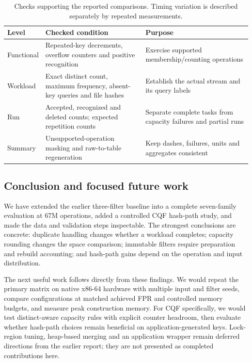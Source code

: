 \begin{table}[!htbp]\centering\small
\caption{Checks supporting the reported comparisons. Timing variation is described separately by repeated measurements.}
\label{tab:validation-levels}
\begin{tabular}{L{2.0cm}L{5.3cm}L{5.3cm}}\toprule
\textbf{Level}&\textbf{Checked condition}&\textbf{Purpose}\\\midrule
Functional&Repeated-key decrements, overflow counters and positive recognition&Exercise supported membership/counting operations\\
Workload&Exact distinct count, maximum frequency, absent-key queries and file hashes&Establish the actual stream and its query labels\\
Run&Accepted, recognized and deleted counts; expected repetition counts&Separate complete tasks from capacity failures and partial runs\\
Summary&Unsupported-operation masking and raw-to-table regeneration&Keep dashes, failures, units and aggregates consistent\\\bottomrule
\end{tabular}
\end{table}

\subsection{Conclusion and focused future work}
We have extended the earlier three-filter baseline into a complete seven-family evaluation at 67M operations, added a controlled CQF hash-path study, and made the data and validation steps inspectable. The strongest conclusions are concrete: duplicate handling changes whether a workload completes; capacity rounding changes the space comparison; immutable filters require preparation and rebuild accounting; and hash-path gains depend on the operation and input distribution.

The next useful work follows directly from these findings. We would repeat the primary matrix on native x86-64 hardware with multiple input and filter seeds, compare configurations at matched achieved FPR and controlled memory budgets, and measure peak construction memory. For CQF specifically, we would test distinct-aware capacity rules with explicit counter headroom, then evaluate whether hash-path choices remain beneficial on application-generated keys. Lock-region tuning, heap-based merging and an application wrapper remain deferred directions from the earlier report; they are not presented as completed contributions here.

